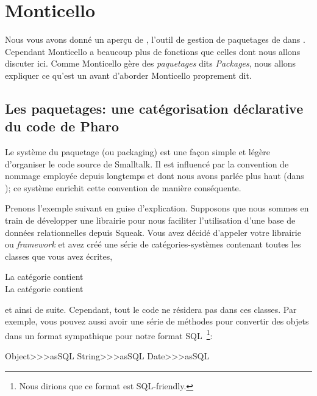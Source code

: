 \documentclass[a4paper,10pt,twoside]{book}
\begin{document}
\section{Monticello}

Nous vous avons donn\'e un aper\c{c}u de , l'outil de gestion
de paquetages de \pharo dans .  
Cependant Monticello a beaucoup plus de fonctions que celles dont nous allons
discuter ici.
Comme Monticello g\`ere des \emph{paquetages} dits \emph{Packages}, nous allons expliquer ce qu'est
un  avant d'aborder Monticello proprement dit.

\subsection{Les paquetages: une cat\'egorisation d\'eclarative du code de Pharo}

Le syst\`eme du paquetage (ou packaging) est une fa\c{c}on simple et l\'eg\`ere
d'organiser le code source de Smalltalk.
Il est influenc\'e par la convention de nommage employ\'ee depuis longtemps et dont nous avons parl\'ee plus haut (dans ); ce syst\`eme enrichit cette convention de mani\`ere cons\'equente.

Prenons l'exemple suivant en guise d'explication.
Supposons que nous sommes en train de d\'evelopper une librairie pour
nous faciliter l'utilisation d'une base de donn\'ees relationnelles depuis
Squeak. Vous avez d\'ecid\'e d'appeler votre librairie ou \emph{framework}
 et avez cr\'e\'e une s\'erie de cat\'egories-syst\`emes
contenant toutes les classes que vous avez \'ecrites, \eg

\vspace{1ex}
\noindent
La cat\'egorie  contient \\
La cat\'egorie  contient 

\vspace{1ex}
\noindent
et ainsi de suite. Cependant, tout le code ne r\'esidera pas dans ces classes.
Par exemple, vous pouvez aussi avoir une s\'erie de m\'ethodes pour 
convertir des objets dans un format sympathique pour notre format SQL~\footnote{Nous dirions que ce format est SQL-friendly.}:

\begin{code}{}
Object>>>asSQL
String>>>asSQL
Date>>>asSQL
\end{code}
\end{document}
